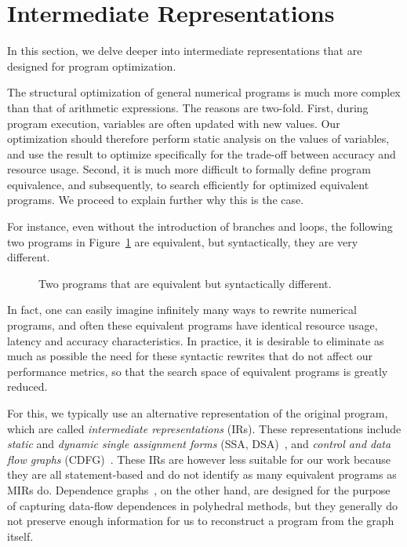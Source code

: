 \section{Intermediate Representations}
\label{bg:sec:intermediate}

In this section, we delve deeper into intermediate representations that are
designed for program optimization.

The structural optimization of general numerical programs is much more complex
than that of arithmetic expressions.  The reasons are two-fold.  First,
during program execution, variables are often updated with new values.  Our
optimization should therefore perform static analysis on the values of
variables, and use the result to optimize specifically for the trade-off
between accuracy and resource usage.  Second, it is much more difficult to
formally define program equivalence, and subsequently, to search efficiently
for optimized equivalent programs.  We proceed to explain further why this is
the case.

For instance, even without the introduction of branches and loops, the
following two programs in Figure~\ref{bg:fig:equiv_progs} are equivalent, but
syntactically, they are very different.
\begin{figure}[ht]
    \centering
     \qquad \qquad
    \caption{%
        Two programs that are equivalent but syntactically different.
    }\label{bg:fig:equiv_progs}
\end{figure}

In fact, one can easily imagine infinitely many ways to rewrite numerical
programs, and often these equivalent programs have identical resource usage,
latency and accuracy characteristics.  In practice, it is desirable to
eliminate as much as possible the need for these syntactic rewrites that do not
affect our performance metrics, so that the search space of equivalent programs
is greatly reduced.

For this, we typically use an alternative representation of the original
program, which are called \emph{intermediate representations} (IRs).  These
representations include \emph{static} and \emph{dynamic single assignment
forms} (SSA, DSA)~\cite{rau92, cytron91}, and \emph{control and data flow
graphs} (CDFG)~\cite{gajski94}.  These IRs are however less suitable for
our work because they are all statement-based and do not identify as many
equivalent programs as MIRs do.  Dependence graphs~\cite{rau94}, on the other
hand, are designed for the purpose of capturing data-flow dependences in
polyhedral methods, but they generally do not preserve enough information for
us to reconstruct a program from the graph itself.

